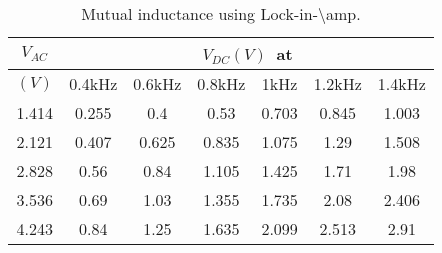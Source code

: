 \begin{table}[]
\caption{Mutual inductance using Lock-in-\textbackslash{}amp.}
\label{tab2}
\begin{tabular}{|c|c|c|c|c|c|c|}
\hline
$V_{AC}$ & \multicolumn{6}{c|}{$V_{DC}(V)$\ at}  \\ \hline
$( V)$   & 0.4kHz & 0.6kHz & 0.8kHz & 1kHz  & 1.2kHz & 1.4kHz \\ \hline
1.414    & 0.255  & 0.4    & 0.53   & 0.703 & 0.845  & 1.003  \\ \hline
2.121    & 0.407  & 0.625  & 0.835  & 1.075 & 1.29   & 1.508  \\ \hline
2.828    & 0.56   & 0.84   & 1.105  & 1.425 & 1.71   & 1.98   \\ \hline
3.536    & 0.69   & 1.03   & 1.355  & 1.735 & 2.08   & 2.406  \\ \hline
4.243    & 0.84   & 1.25   & 1.635  & 2.099 & 2.513  & 2.91   \\ \hline
\end{tabular}
\end{table}